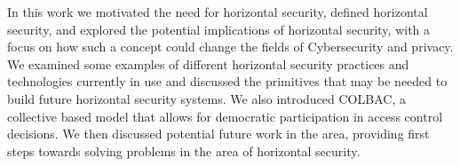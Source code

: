 In this work we motivated the need for horizontal security, defined horizontal
security, and explored the potential implications of horizontal security, with a
focus on how such a concept could change the fields of Cybersecurity and 
privacy. We examined some examples of different horizontal security practices
and technologies currently in use and discussed the primitives that may be
needed to build future horizontal security systems. We also introduced COLBAC,
a collective based  model that allows for democratic participation in access
control decisions. We then discussed potential future work in the area,
providing first steps towards solving problems in the area of horizontal
security.
